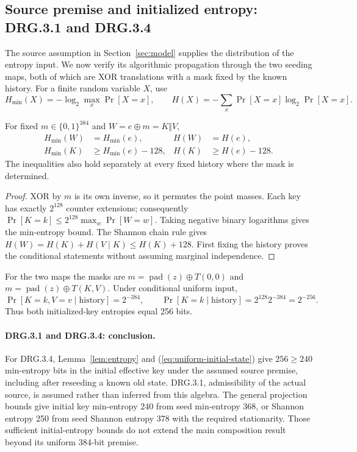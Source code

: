 \documentclass[journal=tosc,preprint,floatrow,nohyperxmp]{iacrtrans}
\numberwithin{lemma}{section}
\numberwithin{proposition}{section}
\newcommand{\bits}{\{0,1\}}
\newcommand{\hm}{H_{\min}}
\newcommand{\pad}{\operatorname{pad}}
\numberwithin{equation}{section}
\theoremstyle{definition}
\numberwithin{definition}{section}
\theoremstyle{plain}
\begin{document}
\subsection{Source premise and initialized entropy: DRG.3.1 and DRG.3.4}\label{sec:entropy}
The source assumption in Section~\ref{sec:model} supplies the distribution of the entropy input. We now verify its algorithmic propagation through the two seeding maps, both of which are XOR translations with a mask fixed by the known history. For a finite random variable $X$, use
\[
 H_{\min}(X)=-\log_2\max_x\Pr[X=x],\qquad
 H(X)=-\sum_x\Pr[X=x]\log_2\Pr[X=x].
\]
\begin{lemma}\label{lem:entropy}
For fixed $m\in\bits^{384}$ and $W=e\oplus m=K\Vert V$,
\begin{align}
 \hm(W)&=\hm(e),& H(W)&=H(e),\label{eq:translate}\\
 \hm(K)&\ge\hm(e)-128,& H(K)&\ge H(e)-128.\label{eq:project}
\end{align}
The inequalities also hold separately at every fixed history where the mask is determined.
\end{lemma}
\begin{proof}
XOR by $m$ is its own inverse, so it permutes the point masses. Each key has exactly $2^{128}$ counter extensions; consequently $\Pr[K=k]\le2^{128}\max_w\Pr[W=w]$. Taking negative binary logarithms gives the min-entropy bound. The Shannon chain rule gives $H(W)=H(K)+H(V\mid K)\le H(K)+128$. First fixing the history proves the conditional statements without assuming marginal independence.
\end{proof}

For the two maps the masks are $m=\pad(z)\oplus T(0,0)$ and $m=\pad(z)\oplus T(K,V)$. Under conditional uniform input,
\begin{equation}
 \Pr[K=k,V=v\mid\text{history}]=2^{-384},\qquad
 \Pr[K=k\mid\text{history}]=2^{128}2^{-384}=2^{-256}.
 \label{eq:uniform-initial-state}
\end{equation}
Thus both initialized-key entropies equal 256 bits.

\paragraph{DRG.3.1 and DRG.3.4: conclusion.}
For DRG.3.4, Lemma~\ref{lem:entropy} and (\ref{eq:uniform-initial-state}) give $256\ge240$ min-entropy bits in the initial effective key under the assumed source premise, including after reseeding a known old state. DRG.3.1, admissibility of the actual source, is assumed rather than inferred from this algebra. The general projection bounds give initial key min-entropy 240 from seed min-entropy 368, or Shannon entropy 250 from seed Shannon entropy 378 with the required stationarity. Those sufficient initial-entropy bounds do not extend the main composition result beyond its uniform 384-bit premise.
\end{document}
